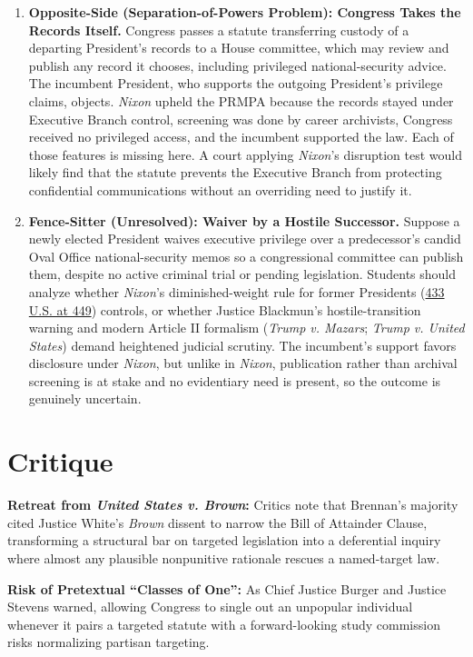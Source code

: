 \documentclass[12pt]{article}
\begin{document}
\begin{enumerate}
\item \textbf{Opposite-Side (Separation-of-Powers Problem): Congress Takes the Records Itself.} Congress passes a statute transferring custody of a departing President's records to a House committee, which may review and publish any record it chooses, including privileged national-security advice. The incumbent President, who supports the outgoing President's privilege claims, objects. \textit{Nixon} upheld the PRMPA because the records stayed under Executive Branch control, screening was done by career archivists, Congress received no privileged access, and the incumbent supported the law. Each of those features is missing here. A court applying \textit{Nixon}'s disruption test would likely find that the statute prevents the Executive Branch from protecting confidential communications without an overriding need to justify it.

\item \textbf{Fence-Sitter (Unresolved): Waiver by a Hostile Successor.} Suppose a newly elected President waives executive privilege over a predecessor's candid Oval Office national-security memos so a congressional committee can publish them, despite no active criminal trial or pending legislation. Students should analyze whether \textit{Nixon}'s diminished-weight rule for former Presidents (\href{https://supreme.justia.com/cases/federal/us/433/425/}{433 U.S. at 449}) controls, or whether Justice Blackmun's hostile-transition warning and modern Article II formalism (\textit{Trump v. Mazars}; \textit{Trump v. United States}) demand heightened judicial scrutiny. The incumbent's support favors disclosure under \textit{Nixon}, but unlike in \textit{Nixon}, publication rather than archival screening is at stake and no evidentiary need is present, so the outcome is genuinely uncertain.

\end{enumerate}

\section{Critique}
\textbf{Retreat from \textit{United States v. Brown}:} Critics note that Brennan's majority cited Justice White's \textit{Brown} dissent to narrow the Bill of Attainder Clause, transforming a structural bar on targeted legislation into a deferential inquiry where almost any plausible nonpunitive rationale rescues a named-target law.

\textbf{Risk of Pretextual ``Classes of One'':} As Chief Justice Burger and Justice Stevens warned, allowing Congress to single out an unpopular individual whenever it pairs a targeted statute with a forward-looking study commission risks normalizing partisan targeting.
\end{document}
